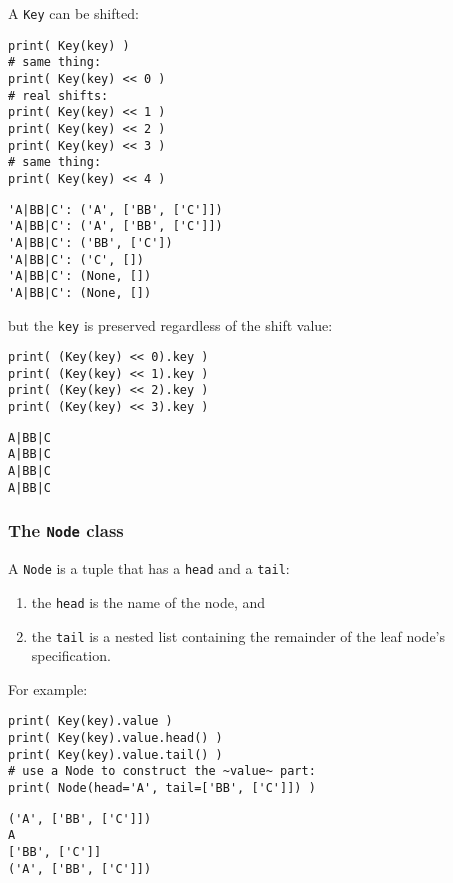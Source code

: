 \documentclass[10pt]{amsart}
\numberwithin{equation}{section}
\begin{document}
A \texttt{Key} can be shifted:
\begin{verbatim}
print( Key(key) )
# same thing:
print( Key(key) << 0 )
# real shifts:
print( Key(key) << 1 )
print( Key(key) << 2 )
print( Key(key) << 3 )
# same thing:
print( Key(key) << 4 )
\end{verbatim}

\begin{verbatim}
'A|BB|C': ('A', ['BB', ['C']])
'A|BB|C': ('A', ['BB', ['C']])
'A|BB|C': ('BB', ['C'])
'A|BB|C': ('C', [])
'A|BB|C': (None, [])
'A|BB|C': (None, [])
\end{verbatim}


but the \texttt{key} is preserved regardless of the shift value:
\begin{verbatim}
print( (Key(key) << 0).key )
print( (Key(key) << 1).key )
print( (Key(key) << 2).key )
print( (Key(key) << 3).key )
\end{verbatim}

\begin{verbatim}
A|BB|C
A|BB|C
A|BB|C
A|BB|C
\end{verbatim}

\subsubsection{The \texttt{Node} class}
\label{sec:orgc04e85f}
A \texttt{Node} is a tuple that has a \texttt{head} and a \texttt{tail}: 

\begin{enumerate}
\item the \texttt{head} is the name of the node, and
\item the \texttt{tail} is a nested list containing the remainder of the leaf node's
specification.
\end{enumerate}

For example:
\begin{verbatim}
print( Key(key).value )
print( Key(key).value.head() )
print( Key(key).value.tail() )
# use a Node to construct the ~value~ part: 
print( Node(head='A', tail=['BB', ['C']]) )
\end{verbatim}

\begin{verbatim}
('A', ['BB', ['C']])
A
['BB', ['C']]
('A', ['BB', ['C']])
\end{verbatim}
\end{document}
